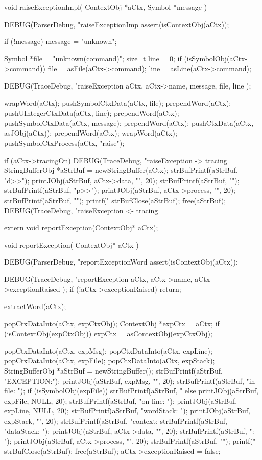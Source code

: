 \startCCode
void raiseExceptionImpl(
  ContextObj *aCtx,
  Symbol     *message
) {
  DEBUG(ParserDebug, "raiseExceptionImp%
  assert(isContextObj(aCtx));

  if (!message) message = "unknown";

  Symbol *file = "unknown(command)";
  size_t  line = 0;
  if (isSymbolObj(aCtx->command)) {
    file = asFile(aCtx->command);
    line = asLine(aCtx->command);
  }

  DEBUG(TraceDebug, "raiseException %
    aCtx, aCtx->name, message, file, line
  );

  wrapWord(aCtx);
  pushSymbolCtxData(aCtx, file);
  prependWord(aCtx);
  pushUIntegerCtxData(aCtx, line);
  prependWord(aCtx);
  pushSymbolCtxData(aCtx, message);
  prependWord(aCtx);
  pushCtxData(aCtx, asJObj(aCtx));
  prependWord(aCtx);
  wrapWord(aCtx);
  pushSymbolCtxProcess(aCtx, "raise");
  
  if (aCtx->tracingOn) {
    DEBUG(TraceDebug, "raiseException -> tracing%
    StringBufferObj *aStrBuf = newStringBuffer(aCtx);
    strBufPrintf(aStrBuf, "d>>");
    printJObj(aStrBuf, aCtx->data, "", 20);
    strBufPrintf(aStrBuf, "\n");
    strBufPrintf(aStrBuf, "p>>");
    printJObj(aStrBuf, aCtx->process, "", 20);
    strBufPrintf(aStrBuf, "\n");
    printf("%
    strBufClose(aStrBuf);
    free(aStrBuf);
    DEBUG(TraceDebug, "raiseException <- tracing%
  }
}
\stopCCode

\startCHeader
extern void reportException(ContextObj* aCtx);
\stopCHeader

\startCCode
void reportException(
  ContextObj* aCtx
) {
  DEBUG(ParserDebug, "reportExceptionWord%
  assert(isContextObj(aCtx));

  DEBUG(TraceDebug, "reportException %
    aCtx, aCtx->name, aCtx->exceptionRaised
  );
  if (!aCtx->exceptionRaised) return;

  extractWord(aCtx);

  popCtxDataInto(aCtx, expCtxObj);
  ContextObj *expCtx = aCtx;
  if (isContextObj(expCtxObj)) {
    expCtx = asContextObj(expCtxObj);
  }
  
  popCtxDataInto(aCtx, expMsg);
  popCtxDataInto(aCtx, expLine);
  popCtxDataInto(aCtx, expFile);
  popCtxDataInto(aCtx, expStack);
  StringBufferObj *aStrBuf = newStringBuffer();
  strBufPrintf(aStrBuf, "\nUNHANDLED EXCEPTION:\n");
  printJObj(aStrBuf, expMsg, "", 20);
  strBufPrintf(aStrBuf, "\n\n     in file: ");
  if (isSymbolObj(expFile)) {
    strBufPrintf(aStrBuf, "%
  } else {
    printJObj(aStrBuf, expFile, NULL, 20);
  }
  strBufPrintf(aStrBuf,   "\n     on line: ");
  printJObj(aStrBuf, expLine, NULL, 20);
  strBufPrintf(aStrBuf, "\n\n   wordStack: ");
  printJObj(aStrBuf, expStack, "", 20);
  strBufPrintf(aStrBuf,   "\n     context: %
  strBufPrintf(aStrBuf,   "\n   dataStack: ");
  printJObj(aStrBuf, aCtx->data, "", 20);
  strBufPrintf(aStrBuf,   "\nprocessStack: ");
  printJObj(aStrBuf, aCtx->process, "", 20);
  strBufPrintf(aStrBuf, "\n");
  printf("%
  strBufClose(aStrBuf);
  free(aStrBuf);
  aCtx->exceptionRaised = false;
}
\stopCCode

